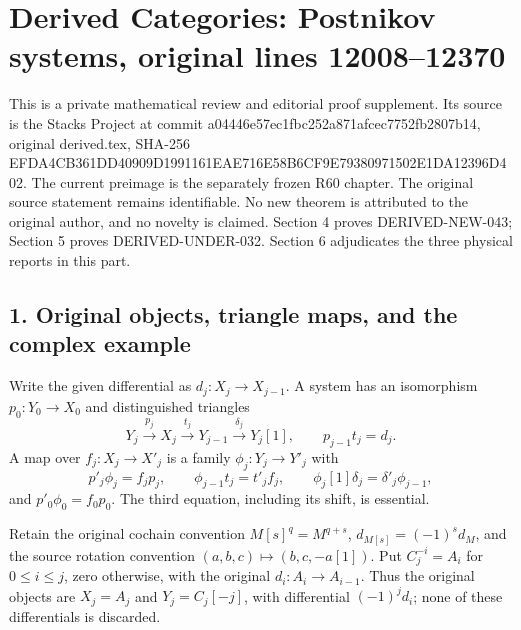 \section{\texorpdfstring{Derived Categories:\allowbreak{} Postnikov systems,\allowbreak{} original lines 12008–\allowbreak{}12370}{Derived  Postnikov  original lines }}\label{proofs-12008-12370-derived-categories-postnikov-systems-original-lines-1200812370}

This is a private mathematical review and editorial proof supplement. Its source is the Stacks Project at commit a04446e5\allowbreak{}7ec1fbc2\allowbreak{}52a871af\allowbreak{}cec7752f\allowbreak{}b2807b14, original derived.tex,\allowbreak{} SHA-256 EFDA4CB3\allowbreak{}61DD4090\allowbreak{}9D199116\allowbreak{}1EAE716E\allowbreak{}58B6CF9E\allowbreak{}79380971\allowbreak{}502E1DA1\allowbreak{}2396D402. The current preimage is the separately frozen R60 chapter. The original source statement remains identifiable. No new theorem is attributed to the original author,\allowbreak{} and no novelty is claimed. Section 4 proves DERIVED-NEW-043; Section 5 proves DERIVED-UNDER-032. Section 6 adjudicates the three physical reports in this part.

\subsection{\texorpdfstring{1. Original objects,\allowbreak{} triangle maps,\allowbreak{} and the complex example}{1. Original  triangle  and the complex example}}\label{proofs-12008-12370-original-objects-triangle-maps-and-the-complex-example}

Write the given differential as \(d_j:X_j\to X_{j-1}\). A system has an isomorphism \(p_0:Y_0\to X_0\) and distinguished triangles \[
Y_j\xrightarrow{p_j}X_j\xrightarrow{t_j}Y_{j-1}
 \xrightarrow{\delta_j}Y_j[1],\qquad p_{j-1}t_j=d_j. \tag{1.1}
\] A map over \(f_j:X_j\to X'_j\) is a family \(\phi_j:Y_j\to Y'_j\) with \[
p'_j\phi_j=f_jp_j,\qquad
\phi_{j-1}t_j=t'_jf_j,\qquad
\phi_j[1]\delta_j=\delta'_j\phi_{j-1}, \tag{1.2}
\] and \(p'_0\phi_0=f_0p_0\). The third equation,\allowbreak{} including its shift,\allowbreak{} is essential.

Retain the original cochain convention \(M[s]^q=M^{q+s}\),\allowbreak{} \(d_{M[s]}=(-1)^s d_M\),\allowbreak{} and the source rotation convention \((a,b,c)\mapsto(b,c,-a[1])\). Put \(C_j^{-i}=A_i\) for \(0\leq i\leq j\),\allowbreak{} zero otherwise,\allowbreak{} with the original \(d_i:A_i\to A_{i-1}\). Thus the original objects are \(X_j=A_j\) and \(Y_j=C_j[-j]\),\allowbreak{} with differential \((-1)^j d_i\); none of these differentials is discarded.

